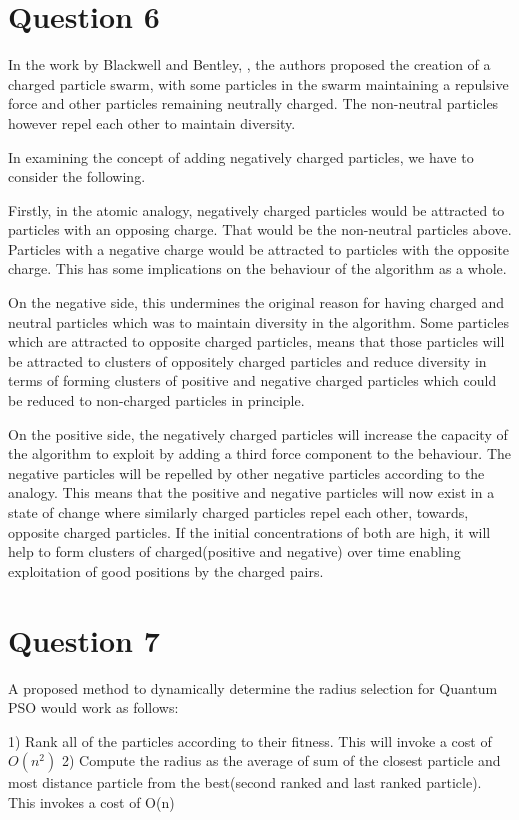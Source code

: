 \documentclass[12pt]{article}
\begin{document}
\section{Question 6}
In the work by Blackwell and Bentley, \cite{Blackwell:2002:DSC:2955491.2955495}, the authors proposed the creation of a charged particle swarm, with some particles in the swarm maintaining a repulsive force and other particles remaining neutrally charged. The non-neutral particles however repel each other to maintain diversity. 

In examining the concept of adding negatively charged particles, we have to consider the following. 

Firstly, in the atomic analogy, negatively charged particles would be attracted to particles with an opposing charge. That would be the non-neutral particles above. Particles with a negative charge would be attracted to particles with the opposite charge. This has some implications on the behaviour of the algorithm as a whole.

On the negative side, this undermines the original reason for having charged and neutral particles which was to maintain diversity in the algorithm. Some particles which are attracted to opposite charged particles, means that those particles will be attracted to clusters of oppositely charged particles and reduce diversity in terms of forming clusters of positive and negative charged particles which could be reduced to non-charged particles in principle.

On the positive side, the negatively charged particles will increase the capacity of the algorithm to exploit by adding a third force component to the behaviour. The negative particles will be repelled by other negative particles according to the analogy. This means that the positive and negative particles will now exist in a state of change where similarly charged particles repel each other, towards, opposite charged particles. If the initial concentrations of both are high, it will help to form clusters of charged(positive and negative) over time enabling exploitation of good positions by the charged pairs.
\section{Question 7}
A proposed method to dynamically determine the radius selection for Quantum PSO would work as follows:

	1) Rank all of the particles according to their fitness. 
	This will invoke a cost of $O(n^2)$
	2) Compute the radius as the average of sum of the closest particle and most distance particle from the best(second ranked and last ranked particle).
	This invokes a cost of O(n)
\end{document}
